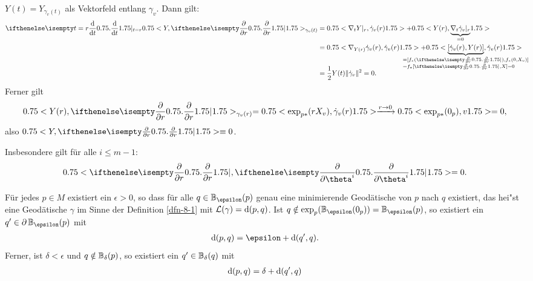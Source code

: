 \begin{bew}
$Y(t) = Y_{\gamma_v(t)}$ als Vektorfeld entlang $\gamma_v$.
Dann gilt:
\begin{align*}
	\difffrac[t=r]{}{t} \left<Y,\pdifffrac{}{r}\right>_{\gamma_v(t)} & = \left<\nabla_tY|_r, \dot \gamma_v(r)\right> + \left<Y(r), \smash{\underbrace{\nabla_t\dot\gamma_v|_r}_{=0}}\right> \vphantom{\underbrace{\gamma_v}_{0}}\\
	& = \left<\nabla_{Y(r)}\dot\gamma_v(r), \dot \gamma_v(r)\right> + \left< \smash{\underbrace{[\dot\gamma_v(r),Y(r)]}_{\mathclap{\begin{subarray}{l}= [f_{*}(\pdifffrac{}{r}),f_{*}(0,X_v)]\\ = f_{*}[\pdifffrac{}{r},X] = 0\end{subarray}}}}, \dot \gamma_v(r) \vphantom{\nabla_{Y(r)}} \right>  \vphantom{\underbrace{\gamma_v(r)}_{\pdifffrac{}{r}} }\\
	&= \frac{1}{2}Y(t) \|\dot\gamma_v\|^2 = 0.
\end{align*}
Ferner gilt
\begin{align*}
	\left<Y(r),\pdifffrac{}{r}\right>_{\gamma_v(r)} = \left<\exp_{p*}(rX_v),\dot\gamma_v(r)\right> \xrightarrow{r \to 0}\left<\exp_{p*}(0_p),v\right> = 0,
\end{align*}
also $\left<Y,\pdifffrac{}{r}\right> \equiv 0$.
\end{bew}

\begin{bem}
  Insbesondere gilt für alle $i \leq m-1$:
  \begin{align*}
    \left<\pdifffrac{}{r}, \pdifffrac{}{\theta^i}\right> = 0.
  \end{align*}
\end{bem}

\begin{Satz}\label{satz-8-7}
Für jedes $p \in M$ existiert ein $\epsilon > 0$, so dass für alle $q \in \B_{\epsilon}(p)$ genau eine minimierende Geodätische von $p$ nach $q$ existiert, das hei"st eine Geodätische $\gamma$ im Sinne der Definition \ref{dfn-8-1} mit $\mathcal L(\gamma) = \mathrm{d}(p,q)$.
Ist $q \notin \exp_p(\B_{\epsilon}(0_p)) = \B_{\epsilon}(p)$, so existiert ein $q' \in \partial \B_{\epsilon}(p)$ mit
\begin{align*}
	\dop(p,q) = \epsilon + \dop(q',q).
\end{align*}
Ferner, ist $\delta < \epsilon$ und $q \notin \operatorname{\mathbb{B}}_\delta(p)$, so existiert ein $q' \in \operatorname{\mathbb{B}}_\delta(q)$ mit
\begin{align*}
	\mathrm{d}(p,q) = \delta + \mathrm{d}(q',q)
\end{align*}
\end{Satz}

